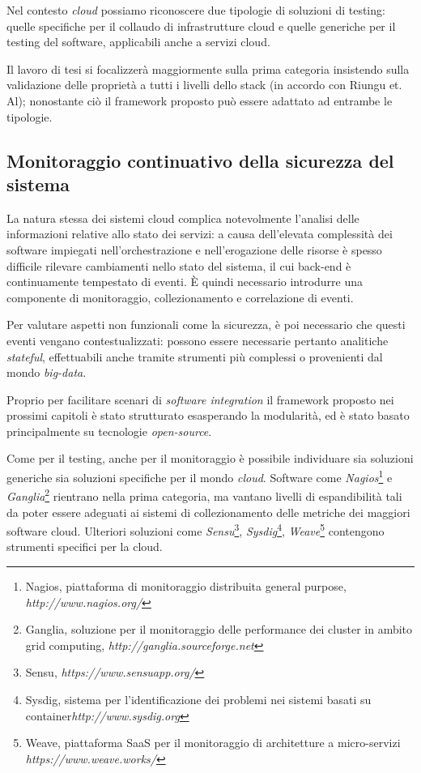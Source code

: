 \documentclass[../main.tex]{subfiles}
\begin{document}
Nel contesto \textit{cloud} possiamo riconoscere due tipologie di soluzioni di testing: quelle specifiche per il collaudo di infrastrutture cloud e quelle generiche per il testing del software, applicabili anche a servizi cloud.


Il lavoro di tesi si focalizzerà maggiormente sulla prima categoria insistendo sulla validazione delle proprietà a tutti i livelli dello stack (in accordo con Riungu et. Al\cite{Ieee5708500}); nonostante ciò il framework proposto può essere adattato ad entrambe le tipologie.


\subsection{Monitoraggio continuativo della sicurezza del sistema}
La natura stessa dei sistemi cloud complica notevolmente l'analisi delle informazioni relative allo stato dei servizi: a causa dell'elevata complessità dei software impiegati nell'orchestrazione e nell'erogazione delle risorse è spesso difficile rilevare cambiamenti nello stato del sistema, il cui back-end è continuamente tempestato di eventi.
È quindi necessario introdurre una componente di monitoraggio, collezionamento e correlazione di eventi.


Per valutare aspetti non funzionali come la sicurezza, è poi necessario che questi eventi vengano contestualizzati: possono essere necessarie pertanto analitiche \textit{stateful}, effettuabili anche tramite strumenti più complessi o provenienti dal mondo \textit{big-data}. 


Proprio per facilitare scenari di \textit{software integration} il framework proposto nei prossimi capitoli è stato strutturato esasperando la modularità, ed è stato basato principalmente su tecnologie \textit{open-source}.


Come per il testing, anche per il monitoraggio è possibile individuare sia soluzioni generiche sia soluzioni specifiche per il mondo \textit{cloud}. Software come \textit{Nagios}\footnote{Nagios, piattaforma di monitoraggio distribuita general purpose, \textit{http://www.nagios.org/}} e \textit{Ganglia}\footnote{Ganglia, soluzione per il monitoraggio delle performance dei cluster in ambito grid computing, \textit{http://ganglia.sourceforge.net}} rientrano nella prima categoria, ma vantano livelli di espandibilità tali da poter essere adeguati ai sistemi di collezionamento delle metriche dei maggiori software cloud.
Ulteriori soluzioni come \textit{Sensu}\footnote{Sensu, \textit{https://www.sensuapp.org/}}, \textit{Sysdig}\footnote{Sysdig, sistema per l'identificazione dei problemi nei sistemi basati su container\textit{http://www.sysdig.org}}, \textit{Weave}\footnote{Weave, piattaforma SaaS per il monitoraggio di architetture a micro-servizi \textit{https://www.weave.works/}} contengono strumenti specifici per la cloud.
\end{document}

